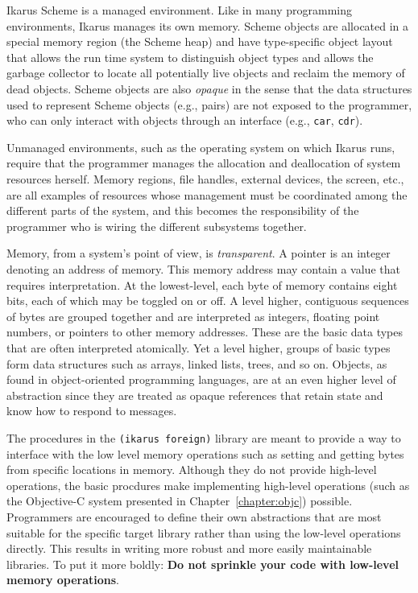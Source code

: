 \documentclass[onecolumn, 12pt, twoside, openright, dvipdfm]{book}
\begin{document}
Ikarus Scheme is a managed environment.  Like in many programming
environments, Ikarus manages its own memory.  Scheme objects are
allocated in a special memory region (the Scheme heap) and have
type-specific object layout that allows the run time system to
distinguish object types and allows the garbage collector to locate
all potentially live objects and reclaim the memory of dead objects.
Scheme objects are also \emph{opaque} in the sense that the data
structures used to represent Scheme objects (e.g., pairs) are not
exposed to the programmer, who can only interact with objects
through an interface (e.g., \texttt{car}, \texttt{cdr}).  

Unmanaged environments, such as the operating system on which Ikarus
runs, require that the programmer manages the allocation and
deallocation of system resources herself.  Memory regions, file
handles, external devices, the screen, etc., are all examples of
resources whose management must be coordinated among the different
parts of the system, and this becomes the responsibility of the
programmer who is wiring the different subsystems together.

Memory, from a system's point of view, is \emph{transparent}.  A
pointer is an integer denoting an address of memory.  This memory
address may contain a value that requires interpretation.  At the
lowest-level, each byte of memory contains eight bits, each of which
may be toggled on or off.  A level higher, contiguous sequences of
bytes are grouped together and are interpreted as integers, floating
point numbers, or pointers to other memory addresses.  These are the
basic data types that are often interpreted atomically.  Yet a level
higher, groups of basic types form data structures such as arrays,
linked lists, trees, and so on.  Objects, as found in
object-oriented programming languages, are at an even higher level
of abstraction since they are treated as opaque references that
retain state and know how to respond to messages.

The procedures in the \texttt{(ikarus~foreign)} library are meant to
provide a way to interface with the low level memory operations such
as setting and getting bytes from specific locations in memory.
Although they do not provide high-level operations, the basic
procdures make implementing high-level operations (such as the
Objective-C system presented in Chapter~\ref{chapter:objc})
possible.  Programmers are encouraged to define their own
abstractions that are most suitable for the specific target library
rather than using the low-level operations directly.  This results
in writing more robust and more easily maintainable libraries.  To
put it more boldly: \textbf{Do not sprinkle your code with low-level
memory operations}.
\end{document}
